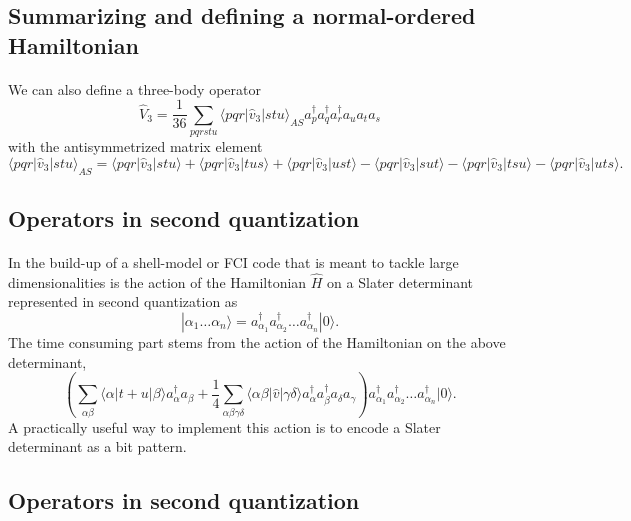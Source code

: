 \documentclass[%
twoside,                 %
final,                   %
10pt]{article}
\begin{document}
\subsection{Summarizing and defining a normal-ordered Hamiltonian}

\paragraph{}
We can also define a three-body operator
\[
\hat{V}_3 = \frac{1}{36} \sum_{pqrstu} \langle pqr|\hat{v}_3|stu\rangle_{AS} 
                a_p^\dagger a_q^\dagger a_r^\dagger a_u a_t a_s
\]
with the antisymmetrized matrix element
\[
            \langle pqr|\hat{v}_3|stu\rangle_{AS} = \langle pqr|\hat{v}_3|stu\rangle + \langle pqr|\hat{v}_3|tus\rangle + \langle pqr|\hat{v}_3|ust\rangle- \langle pqr|\hat{v}_3|sut\rangle - \langle pqr|\hat{v}_3|tsu\rangle - \langle pqr|\hat{v}_3|uts\rangle.
\]





\subsection{Operators in second quantization}

\paragraph{}
In the build-up of a shell-model or FCI code that is meant to tackle large dimensionalities
is the action of the Hamiltonian $\hat{H}$ on a
Slater determinant represented in second quantization as
\[
 |\alpha_1\dots \alpha_n\rangle = a_{\alpha_1}^{\dagger} a_{\alpha_2}^{\dagger} \dots a_{\alpha_n}^{\dagger} |0\rangle.
\]
The time consuming part stems from the action of the Hamiltonian
on the above determinant,
\[
\left(\sum_{\alpha\beta} \langle \alpha|t+u|\beta\rangle a_\alpha^{\dagger} a_\beta + \frac{1}{4} \sum_{\alpha\beta\gamma\delta}
                \langle \alpha \beta|\hat{v}|\gamma \delta\rangle a_\alpha^{\dagger} a_\beta^{\dagger} a_\delta a_\gamma\right)a_{\alpha_1}^{\dagger} a_{\alpha_2}^{\dagger} \dots a_{\alpha_n}^{\dagger} |0\rangle.
\]
A practically useful way to implement this action is to encode a Slater determinant as a bit pattern.




\subsection{Operators in second quantization}
\end{document}
